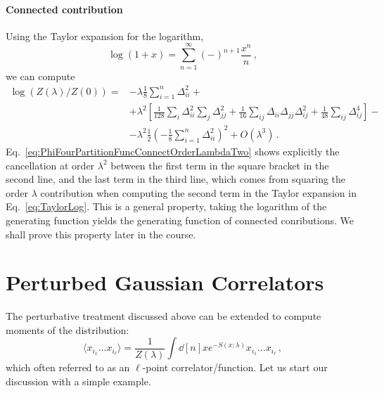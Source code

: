 \documentclass[notes.tex]{subfiles}
\begin{document}
\paragraph{Connected contribution}

Using the Taylor expansion for the logarithm,
\begin{equation}
  \label{eq:TaylorLog}
  \log(1+x) = \sum_{n=1}^\infty (-)^{n+1} \frac{x^n}{n}\, ,
\end{equation}
we can compute
\begin{align}
  \label{eq:PhiFourPartitionFuncConnectOrderLambdaTwo}
  \log\left(Z(\lambda)/Z(0)\right) = 
                    &- \lambda \frac{1}{8} \sum_{i=1}^n \Delta_{ii}^2
                                     +\nonumber \\
                     &+\lambda^2
                    \left[
                    \frac{1}{128} \sum_i \Delta_{ii}^2 \sum_j \Delta_{jj}^2 +
                    \frac{1}{16} \sum_{ij} \Delta_{ii} \Delta_{jj} \Delta_{ij}^2 +
                    \frac{1}{48} \sum_{ij} \Delta_{ij}^4
                    \right] -  \nonumber \\
  &- \lambda^2 \frac{1}{2} \left( - \frac{1}{8}
    \sum_{i=1}^n \Delta_{ii}^2\right)^2 +  O(\lambda^3)\, . 
\end{align}
Eq.~\ref{eq:PhiFourPartitionFuncConnectOrderLambdaTwo} shows
explicitly the cancellation at order $\lambda^2$ between the first
term in the square bracket in the second line, and the last term in
the third line, which comes from squaring the order $\lambda$
contribution when computing the second term in the Taylor expansion in
Eq.~\ref{eq:TaylorLog}. This is a general property, taking the
logarithm of the generating function yields the generating function of
connected conributions. We shall prove this property later in the
course. 

\section{Perturbed Gaussian Correlators}
\label{sec:pert-gauss-corr}

The perturbative treatment discussed above can be extended to compute
moments of the distribution:
\begin{equation}
  \label{eq:lPointCorrPert}
  \langle x_{i_1} \ldots x_{i_\ell}\rangle =
  \frac{1}{Z(\lambda)} 
  \int \dd[n]{x} e^{-S(x;\lambda)} x_{i_1} \ldots x_{i_\ell}\, ,
\end{equation}
which often referred to as an $\ell$-point correlator/function. Let us start
our discussion with a simple example. 
\end{document}

